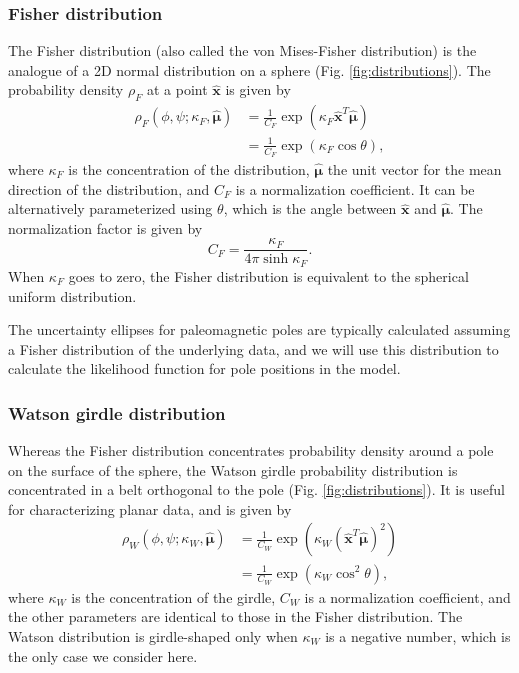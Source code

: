 \documentclass[]{agujournal2019}
\begin{document}
\subsubsection*{Fisher distribution}
The Fisher distribution (also called the von Mises-Fisher distribution) is the analogue of a 2D normal distribution on a sphere (Fig. \ref{fig:distributions}). The probability density $\rho_F$ at a point $\hat{\mathbf{x}}$ is given by
\begin{equation}
  \begin{aligned}
  \rho_F(\phi, \psi ; \kappa_F, \hat{\mathbf{\mu}}) 
  &= \frac{1}{C_F} \exp \left( \kappa_F \hat{\mathbf{x}}^T \hat{\mathbf{\mu}} \right) \\
  &= \frac{1}{C_F} \exp \left( \kappa_F \cos \theta \right),
  \end{aligned}
\end{equation}
where $\kappa_F$ is the concentration of the distribution, 
$\hat{\mathbf{\mu}}$ the unit vector for the mean direction of the distribution, and $C_F$ is a normalization coefficient. It can be alternatively parameterized using $\theta$, which is the angle between $\hat{\mathbf{x}}$ and $\hat{\mathbf{\mu}}$.
The normalization factor is given by 
\begin{equation}
  C_F = \frac{\kappa_F}{4 \pi \sinh{\kappa_F}}.
\end{equation}
When $\kappa_F$ goes to zero, the Fisher distribution is equivalent to the spherical uniform distribution.

The uncertainty ellipses for paleomagnetic poles are typically calculated assuming a Fisher distribution of the underlying data, and we will use this distribution to calculate the likelihood function for pole positions in the model.

\subsubsection*{Watson girdle distribution}
Whereas the Fisher distribution concentrates probability density around a pole on the surface of the sphere, the Watson girdle probability distribution is concentrated in a belt orthogonal to the pole (Fig. \ref{fig:distributions}). It is useful for characterizing planar data, and is given by
\begin{equation}
  \begin{aligned}
  \rho_W(\phi, \psi; \kappa_W, \hat{\mathbf{\mu}}) 
  &= \frac{1}{C_W} \exp \left( \kappa_W (\hat{\mathbf{x}}^T \hat{\mathbf{\mu}})^2 \right) \\
  &= \frac{1}{C_W} \exp \left( \kappa_W \cos^2 \theta \right),
  \end{aligned}
\label{eq:watson}
\end{equation}
where $\kappa_W$ is the concentration of the girdle, $C_W$ is a normalization coefficient, and the other parameters are identical to those in the Fisher distribution. The Watson distribution is girdle-shaped only when $\kappa_W$ is a negative number, which is the only case we consider here.
\end{document}
